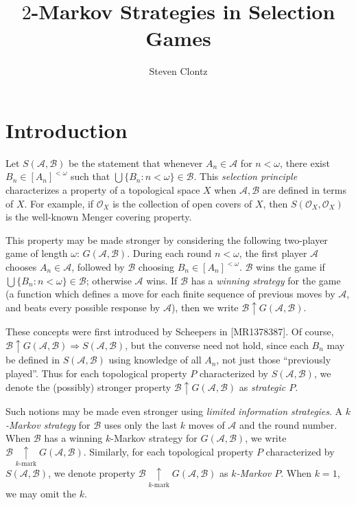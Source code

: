 \documentclass[11pt]{article}
\theoremstyle{plain}
\theoremstyle{definition}
\theoremstyle{remark}
\theoremstyle{plain}
\theoremstyle{definition}
\theoremstyle{remark}
\newcommand{\win}{\uparrow}
\newcommand{\kmarkwin}[1]{\underset{#1\text{-mark}}{\uparrow}}
\newcommand{\sPrinciple}[2]{S(#1,#2)}
\newcommand{\sGame}[2]{G(#1,#2)}
\newcommand{\<}{\langle}
\renewcommand{\>}{\rangle}
\newcommand{\mc}[1]{\mathcal{#1}}
\newcommand{\pl}[1]{\mathscr{#1}}
\newcommand{\term}{\textit}
\begin{document}
\title{\(2\)-Markov Strategies in Selection Games}
\author{Steven Clontz}

\maketitle
{}

\section{Introduction}

Let \(\sPrinciple{\mc A}{\mc B}\) be the statement that whenever
\(A_n\in\mc A\) for \(n<\omega\), there exist \(B_n\in[A_n]^{<\omega}\)
such that \(\bigcup\{B_n:n<\omega\}\in\mc B\). This
\term{selection principle} characterizes a property of a topological space
\(X\) when \(\mc A,\mc B\) are defined in terms of \(X\). For example,
if \(\mc O_X\) is the collection of open covers of \(X\), then
\(\sPrinciple{\mc O_X}{\mc O_X}\) is the well-known Menger covering property.

This property may be made stronger by considering the following two-player
game of length \(\omega\): \(\sGame{\mc A}{\mc B}\). During each round
\(n<\omega\), the first player \(\pl A\) chooses \(A_n\in\mc A\), followed
by \(\pl B\) choosing \(B_n\in[A_n]^{<\omega}\). \(\pl B\) wins the game
if \(\bigcup\{B_n:n<\omega\}\in\mc B\); otherwise \(\pl A\) wins.
If \(\pl B\) has a \term{winning strategy} for the game (a function
which defines a move for each finite sequence of previous moves by
\(\pl A\), and beats every possible response by \(\pl A\)), then we write
\(\pl B\win\sGame{\mc A}{\mc B}\).

These concepts were first introduced by Scheepers in [MR1378387].
Of course,
\(\pl B\win\sGame{\mc A}{\mc B}\Rightarrow \sPrinciple{\mc A}{\mc B}\),
but the converse need not hold, since each \(B_n\) may be defined in
\(\sPrinciple{\mc A}{\mc B}\) using knowledge of all \(A_n\), not just
those ``previously played''. Thus for each topological property \(P\)
characterized by \(\sPrinciple{\mc A}{\mc B}\), we denote the (possibly)
stronger property \(\pl B\win\sGame{\mc A}{\mc B}\) as \term{strategic \(P\)}.

Such notions may be made even stronger using
\term{limited information strategies}. A \term{\(k\)-Markov strategy} for
\(\pl B\) uses only the last \(k\) moves of \(\pl A\) and the round number.
When \(\pl B\) has a winning \(k\)-Markov strategy for \(\sGame{\mc A}{\mc B}\),
we write \(\pl B\kmarkwin{k}\sGame{\mc A}{\mc B}\).
Similarly, for each topological property \(P\)
characterized by \(\sPrinciple{\mc A}{\mc B}\), we denote
property \(\pl B\kmarkwin{k}\sGame{\mc A}{\mc B}\) as \term{\(k\)-Markov \(P\)}.
When \(k=1\), we may omit the \(k\).
\end{document}
